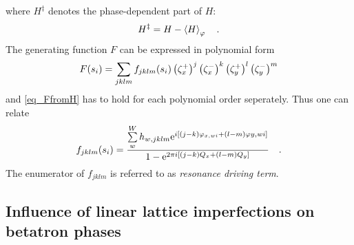 %
where $H^{\ddagger}$ denotes the phase-dependent part of $H$:
%
\begin{equation}
    H^\ddagger = H - \left\langle H \right\rangle_{\varphi}
    \quad .
\end{equation}
%
The generating function $F$ can be expressed in polynomial form
%
\begin{equation}
    F(s_i) = \sum\limits_{jklm} f_{jklm}(s_i) \left(\zeta_x^+\right)^{j} \left(\zeta_x^-\right)^{k} \left(\zeta_y^+\right)^{l} \left(\zeta_y^-\right)^{m}
\end{equation}
%
and \eqref{eq_FfromH} has to hold for each polynomial order seperately. Thus one can relate 
%
\begin{equation}
    f_{jklm}(s_i)=\frac{
        \sum\limits_w^W h_{w,jklm} \text{e}^{i \left[ (j-k) \varphi_{x,wi} + (l-m)\varphi{y,wi} \right]}
    }{
        1-\text{e}^{2\pi i [(j-k)Q_x+(l-m)Q_y]}
    }
    \quad .
    \label{eq_fijkl_from_h}
\end{equation}
%
The enumerator of $f_{jklm}$ is referred to as \emph{resonance driving term}.

\subsection{Influence of linear lattice imperfections on betatron phases}
\label{sec:deriv}
\label{sec_phase_beating}

